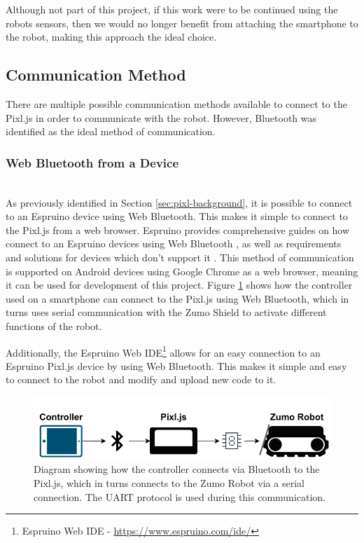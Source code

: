 \documentclass{l4proj}
\begin{document}
Although not part of this project, if this work were to be continued using the robots sensors, then we would no longer benefit from attaching the smartphone to the robot, making this approach the ideal choice.


\subsection{Communication Method}\label{sec:communication method}
There are multiple possible communication methods available to connect to the Pixl.js in order to communicate with the robot. However, Bluetooth was identified as the ideal method of communication.

\subsubsection{Web Bluetooth from a Device} \hfill \\
As previously identified in Section \ref{sec:pixl-background}, it is possible to connect to an Espruino device using Web Bluetooth. This makes it simple to connect to the Pixl.js from a web browser. Espruino provides comprehensive guides on how connect to an Espruino devices using Web Bluetooth \citep{webbluetoothespruino}, as well as requirements and solutions for devices which don't support it \citep{bluetoothquickstartespruino}. This method of communication is supported on Android devices using Google Chrome as a web browser, meaning it can be used for development of this project. Figure \ref{fig:connection-general} shows how the controller used on a smartphone can connect to the Pixl.js using Web Bluetooth, which in turns uses serial communication with the Zumo Shield to activate different functions of the robot.

Additionally, the Espruino Web IDE\footnote{Espruino Web IDE - \url{https://www.espruino.com/ide/}} allows for an easy connection to an Espruino Pixl.js device by using Web Bluetooth. This makes it simple and easy to connect to the robot and modify and upload new code to it.

\begin{figure}[!ht]
    \centering
    \includegraphics[width=0.80\linewidth]{images/connection-general.pdf}
    \caption{Diagram showing how the controller connects via Bluetooth to the Pixl.js, which in turns connects to the Zumo Robot via a serial connection. The UART protocol is used during this communication.}
    \label{fig:connection-general}
\end{figure}
\end{document}
